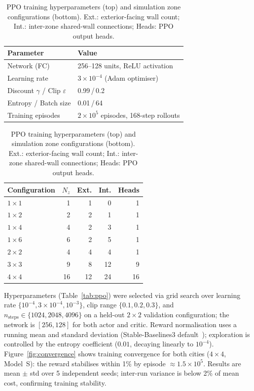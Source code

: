 \documentclass[3p,number]{elsarticle}
\begin{document}
\begin{table}[!t]
\setlength{\hfuzz}{6pt}
\caption{PPO training hyperparameters (top) and simulation zone configurations (bottom).
Ext.: exterior-facing wall count; Int.: inter-zone shared-wall connections; Heads: PPO output heads.}
\label{tab:ppo}\label{tab:configs}
\centering
 
\begin{subtable}{\columnwidth}
\setlength{\tabcolsep}{5pt}
\begin{tabularx}{\columnwidth}{@{}>{\raggedright\arraybackslash}X X@{}}
\toprule
\textbf{Parameter} & \textbf{Value} \\
\midrule
Network (FC)                 & 256--128 units, ReLU activation \\
Learning rate                & $3\times10^{-4}$ (Adam optimiser) \\
Discount $\gamma$ / Clip $\varepsilon$ & 0.99\,/\,0.2 \\
Entropy / Batch size         & 0.01\,/\,64 \\
Training episodes            & $2\times10^{5}$ episodes, 168-step rollouts \\
\bottomrule
\end{tabularx}
\end{subtable}
 
\vspace{8pt}
 
\begin{subtable}{\columnwidth}
\setlength{\tabcolsep}{5pt}
\begin{tabularx}{\columnwidth}{@{}Xrrrr@{}}
\toprule
\textbf{Configuration} & $N_z$ & \textbf{Ext.} & \textbf{Int.} & \textbf{Heads} \\
\midrule
$1\times1$ &  1 & 1 &  0 & 1 \\
$1\times2$ &  2 & 2 &  1 & 1 \\
$1\times4$ &  4 & 2 &  3 & 1 \\
$1\times6$ &  6 & 2 &  5 & 1 \\
$2\times2$ &  4 & 4 &  4 & 1 \\
$3\times3$ &  9 & 8 & 12 & 9 \\
$4\times4$ & 16 &12 & 24 &16 \\
\bottomrule
\end{tabularx}
\end{subtable}
 
\end{table}
 
Hyperparameters (Table~\ref{tab:ppo}) were selected via grid search over learning rate $\{10^{-4},3\times10^{-4},10^{-3}\}$, clip range $\{0.1,0.2,0.3\}$, and $n_{\mathrm{steps}}\in\{1024,2048,4096\}$ on a held-out $2\!\times\!2$ validation configuration; the network is $[256,128]$ for both actor and critic.
Reward normalisation uses a running mean and standard deviation (Stable-Baselines3 default~\cite{Raffin2021}); exploration is controlled by the entropy coefficient ($0.01$, decaying linearly to $10^{-4}$).
Figure~\ref{fig:convergence} shows training convergence for both cities ($4\!\times\!4$, Model~S): the reward stabilises within 1\% by episode ${\approx}1.5\times10^5$.
Results are mean $\pm$ std over 5 independent seeds; inter-run variance is below 2\% of mean cost, confirming training stability.
 
\end{document}
